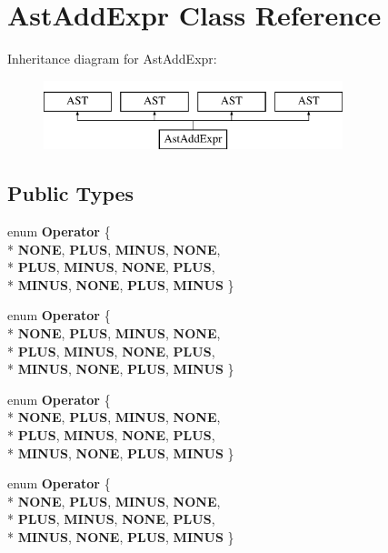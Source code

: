 \hypertarget{classAstAddExpr}{\section{Ast\-Add\-Expr Class Reference}
\label{classAstAddExpr}
}
Inheritance diagram for Ast\-Add\-Expr\-:\begin{figure}[H]
\begin{center}
\leavevmode
\includegraphics[height=2.000000cm]{classAstAddExpr}
\end{center}
\end{figure}
\subsection*{Public Types}
\begin{DoxyCompactItemize}
\item 
enum {\bfseries Operator} \{ \\*
{\bfseries N\-O\-N\-E}, 
{\bfseries P\-L\-U\-S}, 
{\bfseries M\-I\-N\-U\-S}, 
{\bfseries N\-O\-N\-E}, 
\\*
{\bfseries P\-L\-U\-S}, 
{\bfseries M\-I\-N\-U\-S}, 
{\bfseries N\-O\-N\-E}, 
{\bfseries P\-L\-U\-S}, 
\\*
{\bfseries M\-I\-N\-U\-S}, 
{\bfseries N\-O\-N\-E}, 
{\bfseries P\-L\-U\-S}, 
{\bfseries M\-I\-N\-U\-S}
 \}
\item 
enum {\bfseries Operator} \{ \\*
{\bfseries N\-O\-N\-E}, 
{\bfseries P\-L\-U\-S}, 
{\bfseries M\-I\-N\-U\-S}, 
{\bfseries N\-O\-N\-E}, 
\\*
{\bfseries P\-L\-U\-S}, 
{\bfseries M\-I\-N\-U\-S}, 
{\bfseries N\-O\-N\-E}, 
{\bfseries P\-L\-U\-S}, 
\\*
{\bfseries M\-I\-N\-U\-S}, 
{\bfseries N\-O\-N\-E}, 
{\bfseries P\-L\-U\-S}, 
{\bfseries M\-I\-N\-U\-S}
 \}
\item 
enum {\bfseries Operator} \{ \\*
{\bfseries N\-O\-N\-E}, 
{\bfseries P\-L\-U\-S}, 
{\bfseries M\-I\-N\-U\-S}, 
{\bfseries N\-O\-N\-E}, 
\\*
{\bfseries P\-L\-U\-S}, 
{\bfseries M\-I\-N\-U\-S}, 
{\bfseries N\-O\-N\-E}, 
{\bfseries P\-L\-U\-S}, 
\\*
{\bfseries M\-I\-N\-U\-S}, 
{\bfseries N\-O\-N\-E}, 
{\bfseries P\-L\-U\-S}, 
{\bfseries M\-I\-N\-U\-S}
 \}
\item 
enum {\bfseries Operator} \{ \\*
{\bfseries N\-O\-N\-E}, 
{\bfseries P\-L\-U\-S}, 
{\bfseries M\-I\-N\-U\-S}, 
{\bfseries N\-O\-N\-E}, 
\\*
{\bfseries P\-L\-U\-S}, 
{\bfseries M\-I\-N\-U\-S}, 
{\bfseries N\-O\-N\-E}, 
{\bfseries P\-L\-U\-S}, 
\\*
{\bfseries M\-I\-N\-U\-S}, 
{\bfseries N\-O\-N\-E}, 
{\bfseries P\-L\-U\-S}, 
{\bfseries M\-I\-N\-U\-S}
 \}
\end{DoxyCompactItemize}
